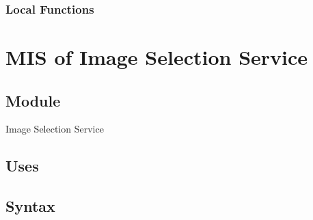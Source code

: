 \documentclass[12pt, titlepage]{article}
\begin{document}
  
  
  
  \subsubsection{Local Functions}

  
   
  

\newpage


\section{MIS of Image Selection Service }\label{image selection service}
  
  
  
  \subsection{Module}
  
  Image Selection Service
  
  \subsection{Uses}
  

  \subsection{Syntax}
\end{document}

